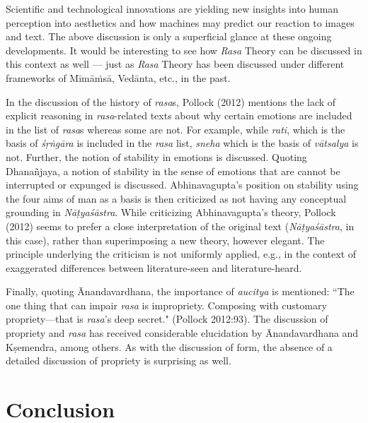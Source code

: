 Scientific and technological innovations are yielding new insights into human perception into aesthetics and how machines may predict our reaction to images and text. The above discussion is only a superficial glance at these ongoing developments. It would be interesting to see how \textsl{Rasa} Theory can be discussed in this context as well --- just as \textsl{Rasa} Theory has been discussed under different frameworks of Mīmāṁsā, Vedānta, etc., in the past. 

In the discussion of the history of \textsl{rasa}s, Pollock (2012) mentions the lack of explicit reasoning in \textsl{rasa}-related texts about why certain emotions are included in the list of \textsl{rasa}s whereas some are not. For example, while \textsl{rati}, which is the basis of \textsl{śṛṅgāra} is included in the \textsl{rasa} list, \textsl{sneha} which is the basis of \textsl{vātsalya} is not. Further, the notion of stability in emotions is discussed. Quoting Dhanañjaya, a notion of stability in the sense of emotions that are cannot be interrupted or expunged is discussed. Abhinavagupta’s position on stability using the four aims of man as a basis is then criticized as not having any conceptual grounding in \textsl{Nāṭyaśāstra}. While criticizing Abhinavagupta’s theory, Pollock (2012) seems to prefer a close interpretation of the original text (\textsl{Nāṭyaśāstra},
 in this case), rather than superimposing a new theory, however elegant. The principle underlying the criticism is not uniformly applied, e.g., in the context of exaggerated differences between literature-seen and literature-heard. 

Finally, quoting Ānandavardhana, the importance of \textsl{aucitya} is mentioned: ``The one thing that can impair \textsl{rasa} is impropriety. Composing with customary propriety—that is \textsl{rasa}’s deep secret." (Pollock 2012:93). The discussion of propriety and \textsl{rasa} has received considerable elucidation by Ānandavardhana and Kṣemendra, among others. As with the discussion of form, the absence of a detailed discussion of propriety is surprising as well. 

\section*{Conclusion}

